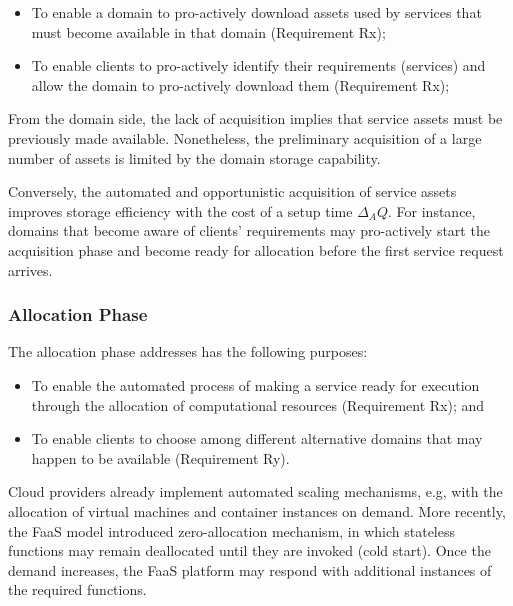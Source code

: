 \begin{itemize}

	\item To enable a domain to pro-actively download assets used by services that must become available in that domain (Requirement Rx);
	
	\item To enable clients to pro-actively identify their requirements (services) and allow the domain to pro-actively download them (Requirement Rx);

\end{itemize}

From the domain side, the lack of acquisition implies that service assets must be previously made available. Nonetheless, the preliminary acquisition of a large number of assets is limited by the domain storage capability. 

Conversely, the automated and opportunistic acquisition of service assets improves storage efficiency with the cost of a setup time $\Delta_AQ$. For instance, domains that become aware of clients' requirements may pro-actively start the acquisition phase and become ready for allocation before the first service request arrives.


\subsubsection{Allocation Phase}\label{sec:A3-E-allocation}

The allocation phase addresses has the following purposes:

\begin{itemize}

\item To enable the automated process of making a service ready for execution through the allocation of computational resources (Requirement Rx); and

\item To enable clients to choose among different alternative domains that may happen to be available (Requirement Ry).

\end{itemize}
 
Cloud providers already implement automated scaling mechanisms, e.g, with the allocation of virtual machines and container instances on demand. More recently, the FaaS model introduced zero-allocation mechanism, in which stateless functions may remain deallocated until they are invoked (cold start). Once the demand increases, the FaaS platform may respond with additional instances of the required functions.

